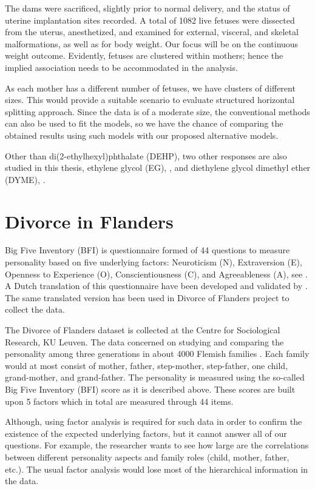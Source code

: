 \documentclass[11pt,a5paper,twoside]{book}
\begin{document}
The dams were sacrificed, slightly prior to normal delivery, and the status of uterine implantation sites recorded. A total of 1082 live fetuses were dissected from the uterus, anesthetized, and examined for external, visceral, and skeletal malformations, as well as for body
weight. Our focus will be on the continuous weight outcome. Evidently, fetuses are clustered within mothers; hence the implied association needs to be accommodated in the analysis. 

As each mother has a different number of fetuses, we have clusters of different sizes. This would provide a suitable scenario to evaluate structured horizontal splitting approach. Since the data is of a moderate size, the conventional methods can also be used to fit the models, so we have the chance of comparing the obtained results using such models with our proposed alternative models.

Other than di(2-ethylhexyl)phthalate (DEHP), two other responses are also studied in this thesis, ethylene glycol (EG), \cite{price1987developmental}, and diethylene glycol dimethyl ether (DYME), \cite{price1985}.

\section{Divorce in Flanders} 

Big Five Inventory (BFI) is questionnaire formed of 44 questions to measure personality based on five underlying factors: Neuroticism (N), Extraversion (E), Openness to Experience (O), Conscientiousness (C), and Agreeableness (A), see \cite{john1999}. A Dutch translation of this questionnaire have been developed and validated by \cite{denissen2008}. The same translated version has been used in Divorce of Flanders project to collect the data.  

The Divorce of Flanders dataset is collected at the Centre for Sociological Research, KU Leuven. The data concerned on studying and comparing the personality among
three generations in about 4000 Flemish families \citep{mortelmans2011}. Each family would at most consist of mother, father, step-mother, step-father, one child, grand-mother, and grand-father.  The personality is measured using the so-called Big Five Inventory (BFI) score as it is described above. These scores are built upon 5 factors which in total are measured through 44 items. 

Although, using factor analysis is required for such data in order to confirm the existence of the expected underlying factors, but it cannot answer all of our questions. For example, the researcher wants to see how large are the correlations between different personality aspects and family roles (child, mother, father, etc.). The usual factor analysis would lose most of the hierarchical information in the data. 
\end{document}

